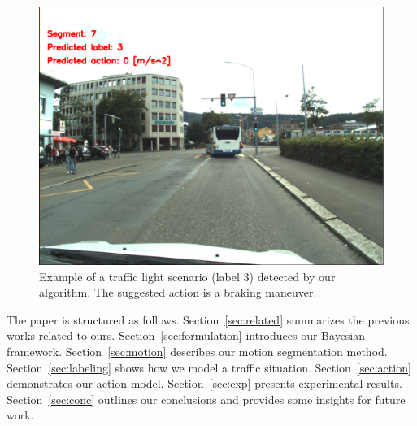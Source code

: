 \begin{figure}[t]
\centering
\includegraphics[scale=0.134]{fig/finalResult.eps}
\caption{Example of a traffic light scenario (label $3$) detected by our
algorithm. The suggested action is a braking maneuver.\vspace{-100mm}}
\label{fig:final}
\end{figure}

The paper is structured as follows. Section~\ref{sec:related}
summarizes the previous works related to ours. Section~\ref{sec:formulation}
introduces our Bayesian framework. Section~\ref{sec:motion} describes our motion
segmentation method. Section~\ref{sec:labeling} shows how we model a traffic
situation. Section~\ref{sec:action} demonstrates our action model.
Section~\ref{sec:exp} presents experimental results. Section~\ref{sec:conc}
outlines our conclusions and provides some insights for future work.

